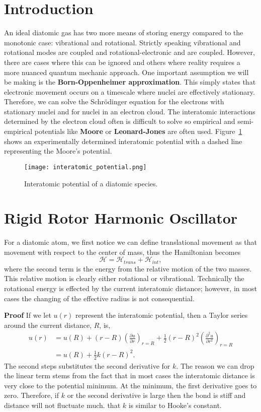 \section{Introduction}%
\label{sec:Intro}
An ideal diatomic gas has two more means of storing energy compared to the
monotonic case: vibrational and rotational. Strictly speaking vibrational and
rotational modes are coupled and rotational-electronic and are coupled. However,
there are cases where this can be ignored and others where reality requires a
more nuanced quantum mechanic approach. One important assumption we will be
making is the \textbf{Born-Oppenheimer approximation}. This simply states that
electronic movement occurs on a timescale where nuclei are effectively
stationary. Therefore, we can solve the Schrödinger equation for the electrons
with stationary nuclei and for nuclei in an electron cloud. The interatomic
interactions determined by the electron cloud often is difficult to solve so
empirical and semi-empirical potentials like \textbf{Moore} or
\textbf{Leonard-Jones} are often used. Figure~\ref{fig:diatomicpotential} shows
an experimentally determined interatomic potential with a dashed line
representing the Moore's potential.
\begin{figure}[htpb]
	\centering
	\texttt{[image: interatomic\_potential.png]}
	\caption{Interatomic potential of a diatomic species.}
	\label{fig:diatomicpotential}
\end{figure}

\section{Rigid Rotor Harmonic Oscillator}%
\label{sec:RR}
For a diatomic atom, we first notice we can define translational movement as
that movement with respect to the center of mass, thus the Hamiltonian becomes
\begin{equation*}
	\mathcal{H} = \mathcal{H}_{trans} + \mathcal{H}_{int},
\end{equation*}
where the second term is the energy from the relative motion of the two masses.
This relative motion is clearly either rotational or vibrational. Technically
the rotational energy is effected by the current interatomic distance; however,
in most cases the changing of the effective radius is not consequential.

\textbf{Proof}
If we let $u(r)$ represent the interatomic potential, then a Taylor series
around the current distance, $R$, is,
\begin{align*}
	u(r) &= u(R) + (r - R)\left(\frac{\partial u}{\partial r}\right)_{r=R} +
	\frac{1}{2}(r - R)^2 \left(\frac{\partial^{2} u}{\partial
	r^2}\right)_{r=R}\\
		 &= u(R) + \frac{1}{2}k(r - R)^2.
\end{align*}
The second steps substitutes the second derivative for $k$. The reason we can
drop the linear term stems from the fact that in most cases the interatomic
distance is very close to the potential minimum. At the minimum, the first
derivative goes to zero. Therefore, if $k$ or the second derivative is large
then the bond is stiff and distance will not fluctuate much. \note%
that $k$ is similar to Hooke's constant.

